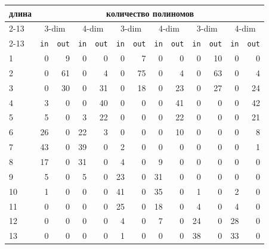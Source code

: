 \documentclass[a4paper,12pt,titlepage]{article}
\begin{document}
\begin{table}[h!]
\centering
\begin{tabular}{ |l||r|r||r|r||r|r||r|r||r|r||r|r| } \hline
\multirow{4}{*}{\bf длина} & \multicolumn{12}{c|}{\bf количество полиномов} \\ \cline{2-13}
    & \multicolumn{2}{c||}{3-dim} & \multicolumn{2}{c||}{4-dim} & \multicolumn{2}{c||}{3-dim} & \multicolumn{2}{c||}{4-dim} & \multicolumn{2}{c||}{3-dim} & \multicolumn{2}{c|}{4-dim} \\ \cline{2-13}
    & \texttt{in} & \texttt{out} & \texttt{in} & \texttt{out} & \texttt{in} & \texttt{out} & \texttt{in} & \texttt{out} & \texttt{in} & \texttt{out} & \texttt{in} & \texttt{out} \\ \hline \hline
1   & 0     & 9     & 0     & 0     & 0     & 7     & 0     & 0     & 0     & 10    & 0     & 0     \\ \hline
2   & 0     & 61    & 0     & 4     & 0     & 75    & 0     & 4     & 0     & 63    & 0     & 4     \\ \hline
3   & 0     & 30    & 0     & 31    & 0     & 18    & 0     & 23    & 0     & 27    & 0     & 24    \\ \hline
4   & 3     & 0     & 0     & 40    & 0     & 0     & 0     & 41    & 0     & 0     & 0     & 42    \\ \hline
5   & 5     & 0     & 3     & 22    & 0     & 0     & 0     & 22    & 0     & 0     & 0     & 21    \\ \hline
6   & 26    & 0     & 22    & 3     & 0     & 0     & 0     & 10    & 0     & 0     & 0     & 8     \\ \hline
7   & 43    & 0     & 39    & 0     & 2     & 0     & 0     & 0     & 0     & 0     & 0     & 1     \\ \hline
8   & 17    & 0     & 31    & 0     & 4     & 0     & 9     & 0     & 0     & 0     & 0     & 0     \\ \hline
9   & 5     & 0     & 5     & 0     & 23    & 0     & 31    & 0     & 0     & 0     & 0     & 0     \\ \hline
10  & 1     & 0     & 0     & 0     & 41    & 0     & 35    & 0     & 1     & 0     & 2     & 0     \\ \hline
11  & 0     & 0     & 0     & 0     & 25    & 0     & 18    & 0     & 4     & 0     & 4     & 0     \\ \hline
12  & 0     & 0     & 0     & 0     & 4     & 0     & 7     & 0     & 24    & 0     & 28    & 0     \\ \hline
13  & 0     & 0     & 0     & 0     & 1     & 0     & 0     & 0     & 38    & 0     & 33    & 0     \\ \hline

\end{tabular}
\end{table}
\end{document}
